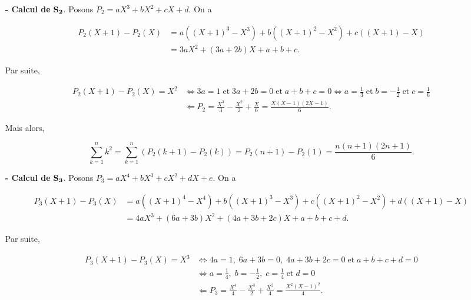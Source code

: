 {\begin{enumerate}
{\begin{itemize}
$$P_1(X+1)-P_1(X)=a((X+1)^2-X^2)+b((X+1)-X)=2aX+(a+b).$$

Par suite,

\begin{align*}
P_1(X+1)-P_1(X)=X&\Leftrightarrow 2a=1\;\mbox{et}\;a+b=0\Leftrightarrow a=\frac{1}{2}\;\mbox{et}\;b=-\frac{1}{2}\\
 &\Leftarrow
P_1=\frac{X^2}{2}-\frac{X}{2}=\frac{X(X-1)}{2}.
\end{align*}

Mais alors,

$$\sum_{k=1}^{n}k=\sum_{k=1}^{n}(P_1(k+1)-P_1(k))=P_1(n+1)-P_1(1)=\frac{n(n+1)}{2}.$$
\item[\textbf{- Calcul de} $\bf{S_2}$.] Posons $P_2=aX^3+bX^2+cX+d$. On a

\begin{align*}
P_2(X+1)-P_2(X) &= a((X+1)^3-X^3)+b((X+1)^2-X^2)+c((X+1)-X) \\
&= 3aX^2+(3a+2b)X+a+b+c.
\end{align*}

Par suite,

\begin{align*}
P_2(X+1)-P_2(X)=X^2&\Leftrightarrow 3a=1\;\mbox{et}\;3a+2b=0\;\mbox{et}\;a+b+c=0\Leftrightarrow
a=\frac{1}{3}\;\mbox{et}\;b=-\frac{1}{2}\;\mbox{et}\;c=\frac{1}{6}\\
 &\Leftarrow P_2=\frac{X^3}{3}-\frac{X^2}{2}+\frac{X}{6}=\frac{X(X-1)(2X-1)}{6}.
\end{align*}

Mais alors,

$$\sum_{k=1}^{n}k^2=\sum_{k=1}^{n}(P_2(k+1)-P_2(k))=P_2(n+1)-P_2(1)=\frac{n(n+1)(2n+1)}{6}.$$
\item[\textbf{- Calcul de} $\bf{S_3}$.] Posons $P_3=aX^4+bX^3+cX^2+dX+e$. On a

\begin{align*}
P_3(X+1)-P_3(X)&=a((X+1)^4-X^4)+b((X+1)^3-X^3)+c((X+1)^2-X^2)+d((X+1)-X)\\
 &=4aX^3+(6a+3b)X^2+(4a+3b+2c)X+a+b+c+d.
\end{align*}

Par suite,

\begin{align*}
P_3(X+1)-P_3(X)=X^3&\Leftrightarrow4a=1,\;6a+3b=0,\;4a+3b+2c=0\;\mbox{et}\;a+b+c+d=0\\
 &\Leftrightarrow
a=\frac{1}{4},\;b=-\frac{1}{2},\;c=\frac{1}{4}\;\mbox{et}\;d=0\\
 &\Leftarrow P_3=\frac{X^4}{4}-\frac{X^3}{2}+\frac{X^2}{4}=\frac{X^2(X-1)^2}{4}.
\end{align*}


\end{itemize}}
\end{enumerate}}
